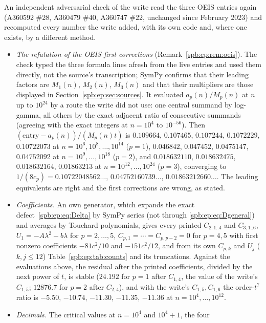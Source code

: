 \begin{writenote}
An independent adversarial check of the write read the three OEIS entries
again (A360592 \#28, A360479 \#40, A360747 \#22, unchanged since February 2023)
and recomputed every number the write added, with its own code and, where one
exists, by a different method.
\begin{itemize}
\item \emph{The refutation of the OEIS first corrections} (Remark~\ref{spb:ep:rem:oeis}).
The check typed the three formula lines afresh from the live entries and used
them directly, not the source's transcription; SymPy confirms that their
leading factors are $M_1(n)$, $M_2(n)$, $M_3(n)$ and that their multipliers
are those displayed in Section~\ref{spb:ep:sec:sources}. It evaluated
$a_p(n)/M_p(n)$ at $n$ up to $10^{24}$ by a route the write did not use: one
central summand by log-gamma, all others by the exact adjacent ratio of
consecutive summands (agreeing with the exact integers at $n=10^4$ to
$10^{-56}$). Then $(\text{entry}-a_p(n))/(M_p(n)t)$ is $0.109664$,
$0.107465$, $0.107244$, $0.1072229$, $0.10722073$ at
$n=10^6,10^8,\ldots,10^{14}$ ($p=1$), $0.046842$, $0.047452$, $0.0475147$,
$0.04752092$ at $n=10^9,\ldots,10^{18}$ ($p=2$), and $0.018632110$,
$0.018632475$, $0.018632164$, $0.01863213$ at $n=10^{12},\ldots,10^{24}$
($p=3$), converging to $1/(8c_p)=0.10722048562\ldots$, $0.04752160739\ldots$,
$0.01863212660\ldots$. The leading equivalents are right and the first
corrections are wrong, as stated.
\item \emph{Coefficients.} An own generator, which expands the exact
defect~\eqref{spb:ep:eq:Delta} by SymPy series (not through
\eqref{spb:ep:eq:Dgeneral}) and averages by Touchard polynomials, gives every
printed $C_{2,1..4}$ and $C_{3,1..6}$, $U_1=-A\lambda^2-b\lambda$ for
$p=2,\ldots,5$, $C_{p,1}=\cdots=C_{p,p-2}=0$ for $p=4,5$ with first nonzero
coefficients $-81c^2/10$ and $-151c^2/12$, and from its own $C_{p,k}$ and
$U_j$ ($k,j\le12$) Table~\ref{spb:ep:tab:counts} and its truncations. Against
the evaluations above, the residual after the printed coefficients, divided by
the next power of $t$, is stable ($24.192$ for $p=1$ after $C_{1,4}$, the
value of the write's $C_{1,5}$; $12876.7$ for $p=2$ after $C_{2,4}$), and with
the write's $C_{1,5},C_{1,6}$ the order-$t^7$ ratio is $-5.50$, $-10.74$,
$-11.30$, $-11.35$, $-11.36$ at $n=10^4,\ldots,10^{12}$.
\item \emph{Decimals.} The critical values at $n=10^4$ and $10^4+1$, the four

\end{itemize}
\end{writenote}
